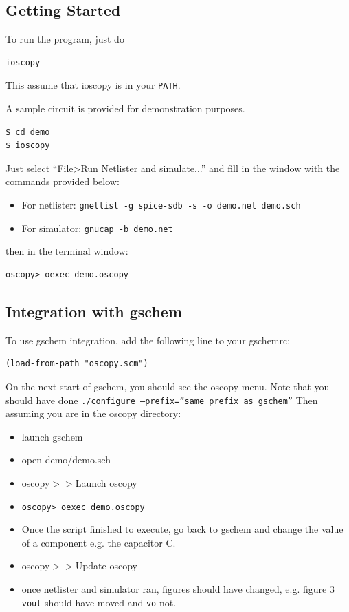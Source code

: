 \documentclass[a4paper,11pt]{report}
\begin{document}
\subsection{Getting Started}
To run the program, just do 
\begin{lstlisting}
ioscopy
\end{lstlisting}
This assume that ioscopy is in your \texttt{PATH}.

A sample circuit is provided for demonstration purposes. 
\begin{lstlisting}
$ cd demo
$ ioscopy
\end{lstlisting}
Just select ``File>Run Netlister and simulate...'' and fill in the window with the commands provided below: 
\begin{itemize}
\item For netlister: \lstinline!gnetlist -g spice-sdb -s -o demo.net demo.sch!
\item For simulator: \lstinline!gnucap -b demo.net!
\end{itemize}
then in the terminal window:
\begin{lstlisting}
oscopy> oexec demo.oscopy
\end{lstlisting}

\subsection{Integration with gschem}
\label{sec:gschemint}
To use gschem integration, add the following line to your gschemrc:
\begin{lstlisting}
(load-from-path "oscopy.scm")
\end{lstlisting}
On the next start of gschem, you should see the oscopy menu. Note that you should have done \texttt{./configure --prefix=''same prefix as gschem''} Then assuming you are in the oscopy directory: 
\begin{itemize}
\item     launch gschem
\item    open demo/demo.sch
\item    oscopy$> >$Launch oscopy
\item    \lstinline!oscopy> oexec demo.oscopy!
\item    Once the script finished to execute, go back to gschem and change the value of a component e.g. the capacitor C.
\item    oscopy$> >$Update oscopy
\item    once netlister and simulator ran, figures should have changed, e.g. figure 3 \texttt{vout} should have moved and \texttt{vo} not.
\end{itemize}
\end{document}
